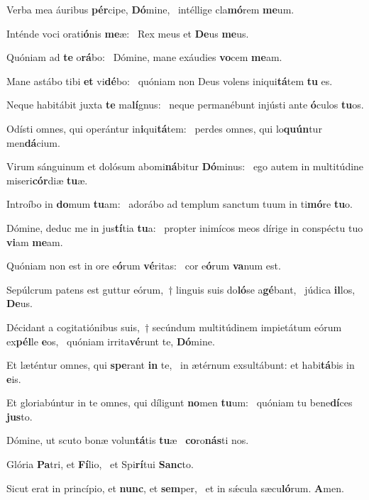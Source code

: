 \item Verba mea áuribus \textbf{pér}cipe, \textbf{Dó}mine,~\psstar{} intéllige cla\textbf{mó}rem \textbf{me}um.
\item Inténde voci orati\textbf{ó}nis \textbf{me}æ:~\psstar{} Rex meus et \textbf{De}us \textbf{me}us.
\item Quóniam ad \textbf{te} o\textbf{rá}bo:~\psstar{} Dómine, mane exáudies \textbf{vo}cem \textbf{me}am.
\item Mane astábo tibi \textbf{et} vi\textbf{dé}bo:~\psstar{} quóniam non Deus volens iniqui\textbf{tá}tem \textbf{tu} es.
\item Neque habitábit juxta \textbf{te} ma\textbf{lí}gnus:~\psstar{} neque permanébunt injústi ante \textbf{ó}culos \textbf{tu}os.
\item Odísti omnes, qui operántur in\textbf{i}qui\textbf{tá}tem:~\psstar{} perdes omnes, qui lo\textbf{quún}tur men\textbf{dá}cium.
\item Virum sánguinum et dolósum abomi\textbf{ná}bitur \textbf{Dó}minus:~\psstar{} ego autem in multitúdine miseri\textbf{cór}diæ \textbf{tu}æ.
\item Introíbo in \textbf{do}mum \textbf{tu}am:~\psstar{} adorábo ad templum sanctum tuum in ti\textbf{mó}re \textbf{tu}o.
\item Dómine, deduc me in jus\textbf{tí}tia \textbf{tu}a:~\psstar{} propter inimícos meos dírige in conspéctu tuo \textbf{vi}am \textbf{me}am.
\item Quóniam non est in ore e\textbf{ó}rum \textbf{vé}ritas:~\psstar{} cor e\textbf{ó}rum \textbf{va}num est.
\item Sepúlcrum patens est guttur eórum,~† linguis suis do\textbf{ló}se a\textbf{gé}bant,~\psstar{} júdica \textbf{il}los, \textbf{De}us.
\item Décidant a cogitatiónibus suis,~† secúndum multitúdinem impietátum eórum ex\textbf{pél}le \textbf{e}os,~\psstar{} quóniam irrita\textbf{vé}runt te, \textbf{Dó}mine.
\item Et læténtur omnes, qui \textbf{spe}rant \textbf{in} te,~\psstar{} in ætérnum exsultábunt: et habi\textbf{tá}bis in \textbf{e}is.
\item Et gloriabúntur in te omnes, qui díligunt \textbf{no}men \textbf{tu}um:~\psstar{} quóniam tu bene\textbf{dí}ces \textbf{jus}to.
\item Dómine, ut scuto bonæ volun\textbf{tá}tis \textbf{tu}æ~\psstar{} \textbf{co}ro\textbf{nás}ti nos.
\item Glória \textbf{Pa}tri, et \textbf{Fí}lio,~\psstar{} et Spi\textbf{rí}tui \textbf{Sanc}to.
\item Sicut erat in princípio, et \textbf{nunc}, et \textbf{sem}per,~\psstar{} et in sǽcula sæcu\textbf{ló}rum. \textbf{A}men.

